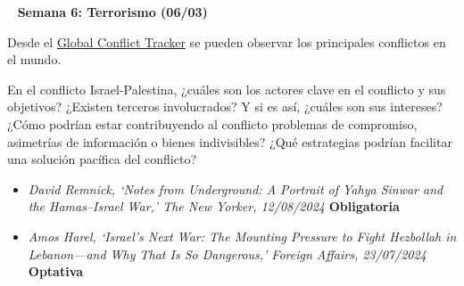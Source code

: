 \documentclass[11pt, a4paper]{article}
\begin{document}
\begin{center} 
\begin{minipage}{6in}
\begin{flushleft}
{\color{darkgreen}{\Rectangle}} ~ \textbf{{\large{Semana 6: Terrorismo (06/03)}}}
\end{flushleft}

Desde el \href{https://www.cfr.org/global-conflict-tracker}{Global Conflict Tracker} se pueden observar los principales conflictos en el mundo. 

En el conflicto Israel-Palestina, ¿cuáles son los actores clave en el conflicto y sus objetivos? ¿Existen terceros involucrados? Y si es así, ¿cuáles son sus intereses? ¿Cómo podrían estar contribuyendo al conflicto problemas de compromiso, asimetrías de información o bienes indivisibles? ¿Qué estrategias podrían facilitar una solución pacífica del conflicto?

\begin{itemize}

    \item \emph{David Remnick, ‘Notes from Underground: A Portrait of Yahya Sinwar and the Hamas–Israel War,’ The New Yorker, 12/08/2024} \textbf{Obligatoria}

    \item \emph{Amos Harel, ‘Israel’s Next War: The Mounting Pressure to Fight Hezbollah in Lebanon—and Why That Is So Dangerous,’ Foreign Affairs, 23/07/2024} \textbf{Optativa}
\end{itemize}

\end{minipage}
\end{center}
\end{document}
